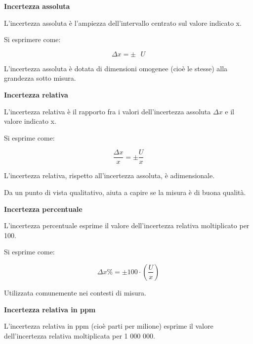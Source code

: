 \textbf{Incertezza assoluta} 

L'incertezza assoluta è l'ampiezza dell'intervallo centrato sul valore indicato x. \newline 

Si esprimere come: 

{
    \Large 
    \begin{equation}
        \Delta x = \pm \text{ } U
    \end{equation}
}


L'incertezza assoluta è dotata di dimensioni omogenee (cioè le stesse) alla grandezza sotto misura. \newline 

\textbf{Incertezza relativa} 

L'incertezza relativa è il rapporto fra i valori dell'incertezza assoluta $\Delta x$ e il valore indicato x. \newline 

Si esprime come: 

{
    \Large 
    \begin{equation}
        \frac{\Delta x}{x} 
        = 
        \pm 
        \frac{U}{x}
    \end{equation}
}

L'incertezza relativa, rispetto all'incertezza assoluta, è adimensionale. \newline 

Da un punto di vista qualitativo, aiuta a capire se la misura è di buona qualità. \newline 

\textbf{Incertezza percentuale}

L'incertezza percentuale esprime il valore dell'incertezza relativa moltiplicato per 100. \newline 

Si esprime come: 

{
    \Large 
    \begin{equation}
        \Delta x \% = \pm 100 \cdot \left(\frac{U}{x}\right)
    \end{equation}
}

Utilizzata comunemente nei contesti di misura. \newline 

\textbf{Incertezza relativa in ppm}

L'incertezza relativa in ppm (cioè parti per milione) esprime il valore dell'incertezza relativa moltiplicata per 1 000 000. \newline 

